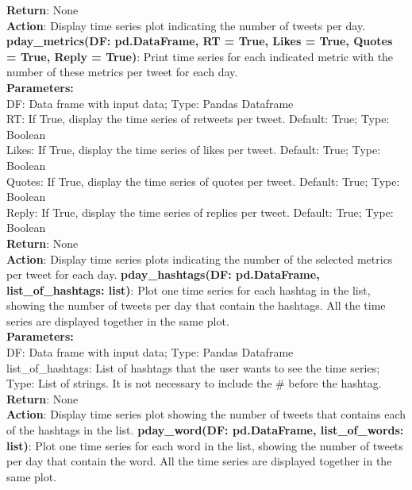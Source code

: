 \textbf{Return}: None\\
\textbf{Action}: Display time series plot indicating the number of tweets per day.
\newline
\newline
\noindent\textbf{pday\_metrics(DF: pd.DataFrame, RT = True, Likes = True, Quotes = True, Reply = True)}: Print time series for each indicated metric with the number of these metrics per tweet for each day.\\
\textbf{Parameters:}\\
DF: Data frame with input data; Type: Pandas Dataframe\\
RT: If True, display the time series of retweets per tweet. Default: True; Type: Boolean\\
Likes: If True, display the time series of likes per tweet. Default: True; Type: Boolean\\
Quotes: If True, display the time series of quotes per tweet. Default: True; Type: Boolean\\
Reply: If True, display the time series of replies per tweet. Default: True; Type: Boolean\\
\textbf{Return}: None\\ 
\textbf{Action}: Display time series plots indicating the number of  the selected metrics per tweet for each day. 
\newline
\newline
\noindent\textbf{pday\_hashtags(DF: pd.DataFrame, list\_of\_hashtags: list)}: Plot one time series for each hashtag in the list, showing the number of tweets per day that contain the hashtags. All the time series are displayed together in the same plot.\\
\textbf{Parameters:}\\
DF: Data frame with input data; Type: Pandas Dataframe\\
list\_of\_hashtags: List of hashtags that the user wants to see the time series; Type: List of strings. It is not necessary to include the \# before the hashtag.\\
\textbf{Return}: None\\ 
\textbf{Action}: Display time series plot showing the number of  tweets that contains each of the hashtags in the list. 
\newline
\newline
\noindent\textbf{pday\_word(DF: pd.DataFrame, list\_of\_words: list)}: Plot one time series for each word in the list, showing the number of tweets per day that contain the word. All the time series are displayed together in the same plot.\\
